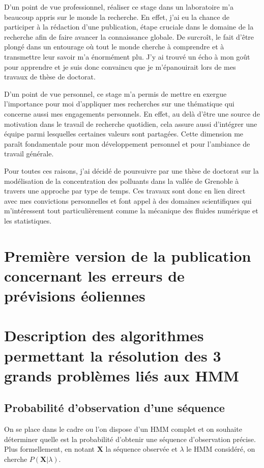 \documentclass[12pt, french]{report}
\begin{document}
D'un point de vue professionnel, réaliser ce stage dans un laboratoire m'a beaucoup appris sur le monde la recherche. En effet, j'ai eu la chance de participer à la rédaction d'une publication, étape cruciale dans le domaine de la recherche afin de faire avancer la connaissance globale. De surcroît, le fait d'être plongé dans un entourage où tout le monde cherche à comprendre et à transmettre leur savoir m'a énormément plu.  J'y ai trouvé un écho à mon goût pour apprendre et je suis donc convaincu que je m'épanouirait lors de mes travaux de thèse de doctorat.

D'un point de vue personnel, ce stage m'a permis de mettre en exergue l'importance pour moi d'appliquer mes recherches sur une thématique qui concerne aussi mes engagements personnels. En effet, au delà d'être une source de motivation dans le travail de recherche quotidien, cela assure aussi d'intégrer une équipe parmi lesquelles certaines valeurs sont partagées. Cette dimension me paraît fondamentale pour mon développement personnel et pour l'ambiance de travail générale.

Pour toutes ces raisons, j'ai décidé de poursuivre par une thèse de doctorat sur la modélisation de la concentration des polluants dans la vallée de Grenoble à travers une approche par type de temps. Ces travaux sont donc en lien direct avec mes convictions personnelles et font appel à des domaines scientifiques qui m'intéressent tout particulièrement comme la mécanique des fluides numérique et les statistiques.


\appendix


\chapter{Première version de la publication concernant les erreurs de prévisions éoliennes}
\label{annex:ModelingWindPower}


\chapter{Description des algorithmes permettant la résolution des 3 grands problèmes liés aux HMM}
\label{annex:HMM_Algos}
\section{Probabilité d’observation d’une séquence}
On se place dans  le cadre ou l'on dispose d'un HMM complet et on souhaite déterminer quelle est la probabilité d'obtenir une séquence d'observation précise. Plus formellement, en notant $\bm{X}$ la séquence observée et $\lambda$ le HMM considéré, on cherche $P(\bm{X}|\lambda)$.
\end{document}
